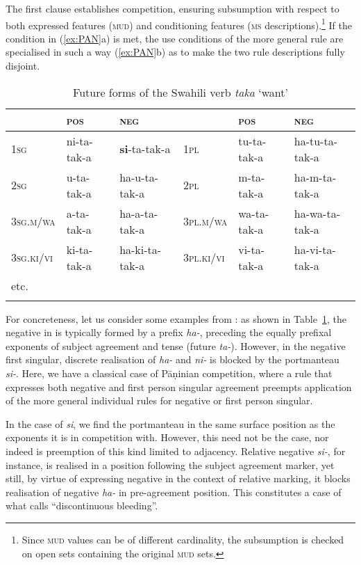 \documentclass[output=paper,biblatex,babelshorthands,newtxmath,draftmode,colorlinks,citecolor=brown]{langscibook}
\begin{document}
\begin{exe}
\begin{xlist}
\begin{exe}
\begin{xlist}
The first clause establishes competition, ensuring subsumption with
respect to both expressed features (\textsc{mud}) and conditioning
features (\textsc{ms} descriptions).\footnote{Since \textsc{mud} values
  can be of different cardinality, the subsumption  is checked
  on  open sets containing the original \textsc{mud} sets. } If the
condition in (\ref{ex:PAN}a) is met, the use
conditions of the more general rule are specialised in such a way (\ref{ex:PAN}b) as
to make the two rule descriptions fully disjoint.


\begin{table}
\setlength{\tabcolsep}{.3em}
\centering
\begin{tabular}{llllll}
\lsptoprule 
 & \textsc{pos} & \textsc{neg}     &             & \textsc{pos} & \textsc{neg}\\
\midrule 
\textsc{1sg} & ni-{ta}-tak-{a} & \textbf{{si}}-{ta}-tak-{a}        & \textsc{1pl} & tu-{ta}-tak-{a}     & {ha}-tu-{ta}-tak-{a}\\
\textsc{2sg} & u-{ta}-tak-{a} & {ha}-u-{ta}-tak-{a}        & \textsc{2pl} & m-{ta}-tak-{a}      & {ha}-m-{ta}-tak-{a}\\
\textsc{3sg.m/wa} & a-{ta}-tak-{a} & {ha}-a-{ta}-tak-{a}    & \textsc{3pl.m/wa} & wa-{ta}-tak-{a} & {ha}-wa-{ta}-tak-{a}\\ 
\textsc{3sg.ki/vi} & ki-{ta}-tak-{a} & {ha}-ki-{ta}-tak-{a} & \textsc{3pl.ki/vi} & vi-{ta}-tak-{a} & {ha}-vi-{ta}-tak-{a}\\
etc. & &\\
\lspbottomrule
\end{tabular}
\caption{Future forms of the Swahili verb  \textit{taka} `want'}
\label{tab:SwahiliPortmanteau}
\end{table}

For concreteness, let us consider some examples from : as
shown in Table~\ref{tab:SwahiliPortmanteau}, the negative in
 is typically formed by a prefix \textit{ha-}, preceding
the equally prefixal exponents of subject agreement and tense (future
\textit{ta-}). However, in the negative first singular, discrete
realisation of \textit{ha-} and \textit{ni-} is blocked by the
portmanteau \textit{si-}. Here, we have a classical case of Pāṇinian
competition, where a rule that expresses both negative and first
person singular agreement preempts application of the more general
individual rules for negative or first person singular.



In the case of \textit{si}, we find the portmanteau in the same
surface position as the exponents it is in competition with.  However,
this need not be the case, nor indeed is preemption of this kind
limited to adjacency. Relative negative \textit{si-}, for instance, is
realised in a position following the subject agreement marker, yet
still, by virtue of expressing negative in the context of relative
marking, it blocks realisation of negative \textit{ha-} in
pre-agreement position. This constitutes a case of what
\citet{Noyer92} calls ``discontinuous bleeding''.


\end{xlist}
\end{exe}
\end{xlist}
\end{exe}
\end{document}
